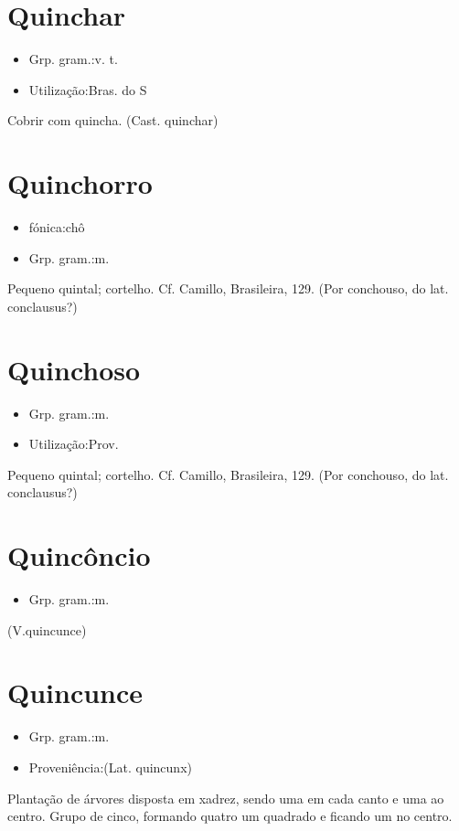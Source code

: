 \section{Quinchar}
\begin{itemize}
\item {Grp. gram.:v. t.}
\end{itemize}
\begin{itemize}
\item {Utilização:Bras. do S}
\end{itemize}
Cobrir com quincha.
(Cast. \textunderscore quinchar\textunderscore )
\section{Quinchorro}
\begin{itemize}
\item {fónica:chô}
\end{itemize}
\begin{itemize}
\item {Grp. gram.:m.}
\end{itemize}
Pequeno quintal; cortelho. Cf. Camillo, \textunderscore Brasileira\textunderscore , 129.
(Por \textunderscore conchouso\textunderscore , do lat. \textunderscore conclausus\textunderscore ?)
\section{Quinchoso}
\begin{itemize}
\item {Grp. gram.:m.}
\end{itemize}
\begin{itemize}
\item {Utilização:Prov.}
\end{itemize}
Pequeno quintal; cortelho. Cf. Camillo, \textunderscore Brasileira\textunderscore , 129.
(Por \textunderscore conchouso\textunderscore , do lat. \textunderscore conclausus\textunderscore ?)
\section{Quincôncio}
\begin{itemize}
\item {Grp. gram.:m.}
\end{itemize}
(V.quincunce)
\section{Quincunce}
\begin{itemize}
\item {Grp. gram.:m.}
\end{itemize}
\begin{itemize}
\item {Proveniência:(Lat. \textunderscore quincunx\textunderscore )}
\end{itemize}
Plantação de árvores disposta em xadrez, sendo uma em cada canto e uma ao centro.
Grupo de cinco, formando quatro um quadrado e ficando um no centro.

